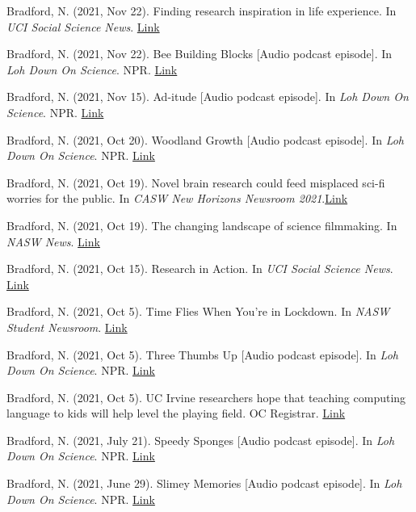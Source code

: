 \documentclass[margin, 10pt]{res} %
\begin{document}
\begin{resume}
Bradford, N. (2021, Nov 22). Finding research inspiration in life experience. In {\sl UCI Social Science News}. \href{https://www.socsci.uci.edu/newsevents/news/2021/2021-11-22-zeinab-kachakeche.php}{Link}

Bradford, N. (2021, Nov 22). Bee Building Blocks [Audio podcast episode]. In {\sl Loh Down On Science}. NPR. \href{https://lohdownonscience.com/bee-building-blocks/}{Link}

Bradford, N. (2021, Nov 15). Ad-itude [Audio podcast episode]. In {\sl Loh Down On Science}. NPR. \href{https://lohdownonscience.com/ad-itude/}{Link}

Bradford, N. (2021, Oct 20). Woodland Growth [Audio podcast episode]. In {\sl Loh Down On Science}. NPR. \href{https://lohdownonscience.com/woodland-growth/}{Link}

Bradford, N. (2021, Oct 19). Novel brain research could feed misplaced sci-fi worries for the public. In {\sl CASW New Horizons Newsroom 2021}.\href{https://casw.org/news/novel-brain-research-could-feed-misplaced-sci-fi-worries-for-the-public/}{Link} 

Bradford, N. (2021, Oct 19). The changing landscape of science filmmaking. In {\sl NASW News}. \href{https://www.nasw.org/article/changing-landscape-science-filmmaking}{Link} 

Bradford, N. (2021, Oct 15). Research in Action. In {\sl UCI Social Science News}. \href{https://www.socsci.uci.edu/newsevents/news/2021/2021-10-15-gillooly.php}{Link} 

Bradford, N. (2021, Oct 5). Time Flies When You're in Lockdown. In {\sl NASW Student Newsroom}. \href{https://nasw.org/article/time-flies-when-youre-lockdown}{Link}

Bradford, N. (2021, Oct 5). Three Thumbs Up [Audio podcast episode]. In {\sl Loh Down On Science}. NPR. \href{https://lohdownonscience.com/three-thumbs-up/}{Link}

Bradford, N. (2021, Oct 5). UC Irvine researchers hope that teaching computing language to kids will help level the playing field. OC Registrar. \href{https://www.ocregister.com/2021/10/05/uc-irvine-researchers-hope-that-teaching-computing-language-to-kids-will-help-level-the-playing-field/}{Link}

Bradford, N. (2021, July 21). Speedy Sponges [Audio podcast episode]. In {\sl Loh Down On Science}. NPR. \href{https://lohdownonscience.com/speedy-sponges/}{Link}

Bradford, N. (2021, June 29). Slimey Memories [Audio podcast episode]. In {\sl Loh Down On Science}. NPR. \href{https://lohdownonscience.com/slimey-memories/}{Link}


\end{resume}
\end{document}
